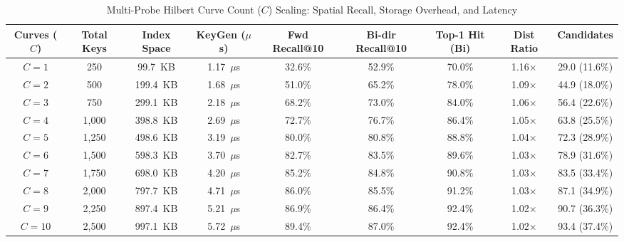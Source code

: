 \begin{table}[t]
\centering
\caption{Multi-Probe Hilbert Curve Count ($C$) Scaling: Spatial Recall, Storage Overhead, and Latency}
\label{tab:hilbert_curve_sweep}
\begin{tabular}{ccccccccc}
\hline
\textbf{Curves ($C$)} & \textbf{Total Keys} & \textbf{Index Space} & \textbf{KeyGen ($\mu$s)} & \textbf{Fwd Recall@10} & \textbf{Bi-dir Recall@10} & \textbf{Top-1 Hit (Bi)} & \textbf{Dist Ratio} & \textbf{Candidates} \\
\hline
$C = 1$ & 250 & 99.7~KB & 1.17~$\mu$s & 32.6\% & 52.9\% & 70.0\% & 1.16$\times$ & 29.0 (11.6\%) \\
$C = 2$ & 500 & 199.4~KB & 1.68~$\mu$s & 51.0\% & 65.2\% & 78.0\% & 1.09$\times$ & 44.9 (18.0\%) \\
$C = 3$ & 750 & 299.1~KB & 2.18~$\mu$s & 68.2\% & 73.0\% & 84.0\% & 1.06$\times$ & 56.4 (22.6\%) \\
$C = 4$ & 1,000 & 398.8~KB & 2.69~$\mu$s & 72.7\% & 76.7\% & 86.4\% & 1.05$\times$ & 63.8 (25.5\%) \\
$C = 5$ & 1,250 & 498.6~KB & 3.19~$\mu$s & 80.0\% & 80.8\% & 88.8\% & 1.04$\times$ & 72.3 (28.9\%) \\
$C = 6$ & 1,500 & 598.3~KB & 3.70~$\mu$s & 82.7\% & 83.5\% & 89.6\% & 1.03$\times$ & 78.9 (31.6\%) \\
$C = 7$ & 1,750 & 698.0~KB & 4.20~$\mu$s & 85.2\% & 84.8\% & 90.8\% & 1.03$\times$ & 83.5 (33.4\%) \\
$C = 8$ & 2,000 & 797.7~KB & 4.71~$\mu$s & 86.0\% & 85.5\% & 91.2\% & 1.03$\times$ & 87.1 (34.9\%) \\
$C = 9$ & 2,250 & 897.4~KB & 5.21~$\mu$s & 86.9\% & 86.4\% & 92.4\% & 1.02$\times$ & 90.7 (36.3\%) \\
$C = 10$ & 2,500 & 997.1~KB & 5.72~$\mu$s & 89.4\% & 87.0\% & 92.4\% & 1.02$\times$ & 93.4 (37.4\%) \\
\hline
\end{tabular}
\end{table}
